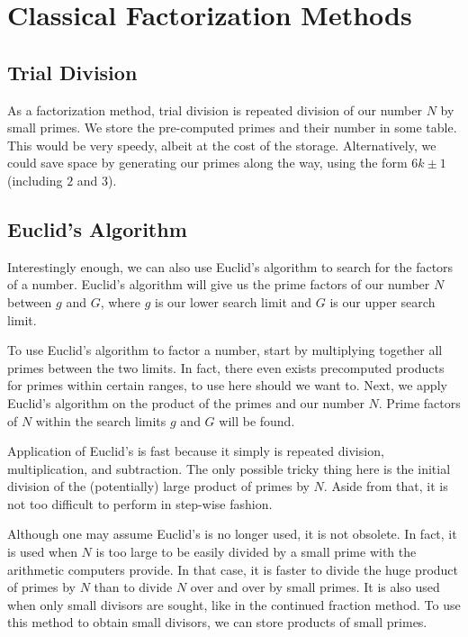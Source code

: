 \documentclass{article}
\begin{document}
\section{Classical Factorization Methods}

\subsection{ Trial Division }
\par As a factorization method, trial division is repeated division of our number $N$ by
small primes. We store the pre-computed primes and their number in some table. This would be very
speedy, albeit at the cost of the storage. Alternatively, we could save space by generating our
primes along the way, using the form $6k \pm 1$ (including $2$ and $3$).

\subsection{ Euclid's Algorithm }
\par Interestingly enough, we can also use Euclid's algorithm to search for the factors of a
number. Euclid's algorithm will give us the prime factors of our number $N$ between $g$ and $G$, where
$g$ is our lower search limit and $G$ is our upper search limit.

\par To use Euclid's algorithm to factor a number, start by multiplying together all primes between
the two limits. In fact, there even exists precomputed products for primes within certain ranges, to
use here should we want to. Next, we apply Euclid's algorithm on the product of the primes and our number
$N$. Prime factors of $N$ within the search limits $g$ and $G$ will be found.

\par Application of Euclid's is fast because it simply is repeated division, multiplication, and
subtraction. The only possible tricky thing here is the initial division of the (potentially) large product
of primes by $N$. Aside from that, it is not too difficult to perform in step-wise fashion.

\par Although one may assume Euclid's is no longer used, it is not obsolete. In fact, it is used when $N$ is
too large to be easily divided by a small prime with the arithmetic computers provide. In that case, it
is faster to divide the huge product of primes by $N$ than to divide $N$ over and over by small primes.
It is also used when only small divisors are sought, like in the continued fraction method. To use this method
to obtain small divisors, we can store products of small primes.
\end{document}
